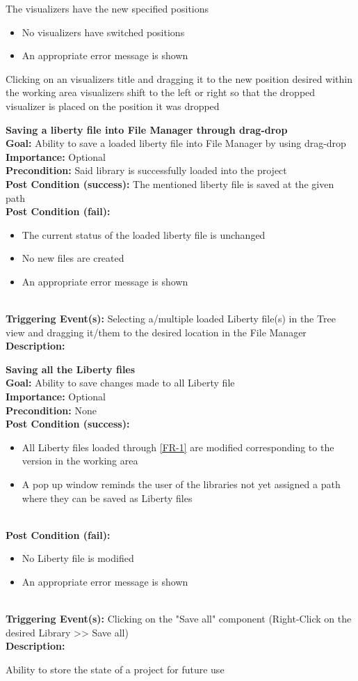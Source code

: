 \documentclass[10pt,a4paper]{report}
\newcommand{\precondition}[1]{
    \textbf{Precondition: } #1 \leavevmode \\
}
\newcommand{\FRDescription}[8]{
    \textbf{#1} \leavevmode \\
    \textbf{Goal: } #2 \leavevmode \\
    \textbf{Importance: } #3 \leavevmode \\
    \precondition{#4}
    \textbf{Post Condition (success): } #5 \leavevmode \\
    \textbf{Post Condition (fail): } #6 \leavevmode \\
    \textbf{Triggering Event(s): } #7 \leavevmode \\
    \textbf{Description: } \leavevmode \\ 
    #8}
\newcommand{\FRODescription}[8]{
    \textbf{#1} \leavevmode \\
    \textbf{Goal: } #2 \leavevmode \\
    \textbf{Importance: } #3 \leavevmode \\
    \precondition{#4}
    \textbf{Post Condition (success): } #5 \leavevmode \\
    \textbf{Post Condition (fail): } #6 \leavevmode \\
    \textbf{Triggering Event(s): } #7 \leavevmode \\
    \textbf{Description: } \leavevmode \\
    #8}
\begin{document}
\begin{FRO}
    {The visualizers have the new specified positions}
    {\begin{itemize}
        \item No visualizers have switched positions
        \item An appropriate error message is shown
    \end{itemize}}
    {Clicking on an visualizers title and dragging it to the new position desired within the working area}
    {visualizers shift to the left or right so that the dropped visualizer is placed on the position it was dropped}
    \item \FRODescription{Saving a liberty file into File Manager through drag-drop}
    {Ability to save a loaded liberty file into File Manager by using drag-drop}
    {Optional}
    {Said library is successfully loaded into the project}
    {The mentioned liberty file is saved at the given path}
    {\begin{itemize}
        \item The current status of the loaded liberty file is unchanged
        \item No new files are created
        \item An appropriate error message is shown
    \end{itemize}}
    {Selecting a/multiple loaded Liberty file(s) in the Tree view and dragging it/them to the desired location in the File Manager}
    \item \FRDescription{Saving all the Liberty files}
    {Ability to save changes made to all Liberty file}
    {Optional}
    {None}
    {\begin{itemize}
        \item All Liberty files loaded through \ref{FR-1} are modified corresponding to the version in the working area
        \item A pop up window reminds the user of the libraries not yet assigned a path where they can be saved as Liberty files
    \end{itemize}}
    {\begin{itemize}
        \item No Liberty file is modified
        \item An appropriate error message is shown
    \end{itemize}}
    {Clicking on the "Save all" component (Right-Click on the desired Library  >> Save all)}
    \item {}
    {Ability to store the state of a project for future use}

\end{FRO}
\end{document}
